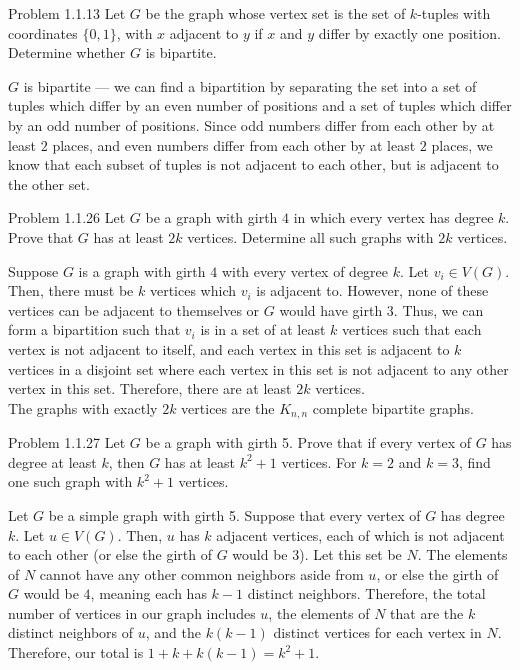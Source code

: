 \documentclass[8pt]{extarticle}
\title{}
\author{Avinash Iyer}
\date{}
\begin{document}
\begin{mathbox}{Problem 1.1.13}
    Let $G$ be the graph whose vertex set is the set of $k$-tuples with coordinates $\{0,1\}$, with $x$ adjacent to $y$ if $x$ and $y$ differ by exactly one position. Determine whether $G$ is bipartite.
  \end{mathbox}
  \noindent $G$ is bipartite --- we can find a bipartition by separating the set into a set of tuples which differ by an even number of positions and a set of tuples which differ by an odd number of positions. Since odd numbers differ from each other by at least $2$ places, and even numbers differ from each other by at least $2$ places, we know that each subset of tuples is not adjacent to each other, but is adjacent to the other set. 
\begin{mathbox}{Problem 1.1.26}
     Let $G$ be a graph with girth $4$ in which every vertex has degree $k$. Prove that $G$ has at least $2k$ vertices. Determine all such graphs with $2k$ vertices. 
  \end{mathbox}
  \noindent Suppose $G$ is a graph with girth $4$ with every vertex of degree $k$. Let $v_i\in V(G)$. Then, there must be $k$ vertices which $v_i$ is adjacent to. However, none of these vertices can be adjacent to themselves or $G$ would have girth $3$. Thus, we can form a bipartition such that $v_i$ is in a set of at least $k$ vertices such that each vertex is not adjacent to itself, and each vertex in this set is adjacent to $k$ vertices in a disjoint set where each vertex in this set is not adjacent to any other vertex in this set. Therefore, there are at least $2k$ vertices.\\

  \noindent The graphs with exactly $2k$ vertices are the $K_{n,n}$ complete bipartite graphs.

\begin{mathbox}{Problem 1.1.27}
    Let $G$ be a graph with girth 5. Prove that if every vertex of $G$ has degree at least $k$, then $G$ has at least $k^2+1$ vertices. For $k=2$ and $k=3$, find one such graph with $k^2+1$ vertices.      
  \end{mathbox}
  \noindent Let $G$ be a simple graph with girth 5. Suppose that every vertex of $G$ has degree $k$. Let $u\in V(G)$. Then, $u$ has $k$ adjacent vertices, each of which is not adjacent to each other (or else the girth of $G$ would be $3$). Let this set be $N$. The elements of $N$ cannot have any other common neighbors aside from $u$, or else the girth of $G$ would be $4$, meaning each has $k-1$ distinct neighbors. Therefore, the total number of vertices in our graph includes $u$, the elements of $N$ that are the $k$ distinct neighbors of $u$, and the $k(k-1)$ distinct vertices for each vertex in $N$. Therefore, our total is $1 + k + k(k-1) = k^2 + 1$.\\
\end{document}
